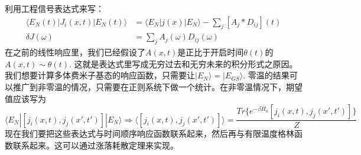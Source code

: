 \documentclass{article}
\numberwithin{equation}{subsection}
\begin{document}
利用工程信号表达式来写：
\begin{equation}
    \begin{split}
        \langle E_N(t)|J_i(x,t)|E_N(t)\rangle&=\langle E_N|j(x)|E_N\rangle-\sum_{j}[A_j\ast D_{ij}](t)\\
        \delta J(\omega)&=\sum_{j}A_j(\omega)D_{ij}(\omega)
    \end{split}
\end{equation}
在之前的线性响应里，我们已经假设了$A(x,t)$是正比于开启时间$\theta(t)$的$A(x,t)\sim\theta(t)$. 这就是表达式里写成无穷过去和无穷未来的积分形式之原因。我们想要计算多体费米子基态的响应函数，只需要让$|E_N\rangle=|E_{GS}\rangle$. 零温的结果可以推广到非零温的情况，只需要在正则系统下做一个统计。在非零温情况下，期望值应该写为
\begin{equation}
    \langle E_N|[j_i(x,t),j_j(x',t')]|E_N\rangle\Longrightarrow\langle[j_i(x,t),j_j(x',t')]\rangle=\frac{Tr\{e^{-\beta H_0}[j_i(x,t),j_j(x',t')]\}}{Z}
\end{equation}
现在我们要把这些表达式与时间顺序响应函数联系起来，然后再与有限温度格林函数联系起来。这可以通过涨落耗散定理来实现。
\end{document}
